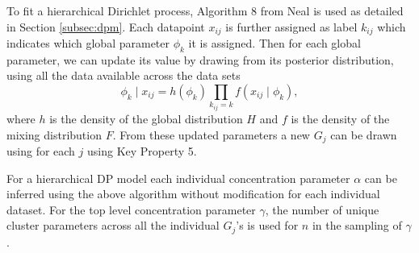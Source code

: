 \documentclass[nojss]{jss}
\begin{document}
To fit a hierarchical Dirichlet process, Algorithm 8 from Neal is used as detailed in Section \ref{subsec:dpm}. Each datapoint $x_{ij}$ is further assigned as label $k_{ij}$ which indicates which global parameter $\phi _k$ it is assigned. Then for each global parameter, we can update its value by drawing from its posterior distribution, using all the data available across the data sets
\begin{equation}
\phi _k \mid x_{ij} = h(\phi _k) \prod _{k_{ij} = k} f(x_{ij} \mid \phi _k ) ,
\end{equation}
where $h$ is the density of the global distribution $H$ and $f$ is the density of the mixing distribution $F$. From these updated parameters a new $G_j$ can be drawn using for each $j$ using Key Property 5.

For a hierarchical DP model each individual concentration parameter $\alpha$ can be inferred using the above algorithm without modification for each individual dataset.  For the top level concentration parameter $\gamma$, the number of unique cluster parameters across all the individual $G_j$'s is used for $n$ in the sampling of $\gamma$.
\end{document}
